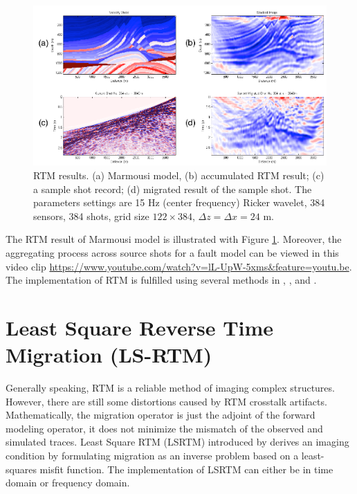 \documentclass[11pt,titlepage]{article}
\theoremstyle{plain}
\theoremstyle{definition}
\theoremstyle{remark}
\numberwithin{equation}{section}
\begin{document}
\begin{figure}[htbp]
\centering
\includegraphics[width=1\textwidth]{Fig/MarmousiRTM.pdf}
\caption{RTM results. (a) Marmousi model, (b) accumulated RTM result; (c) a sample shot record; (d) migrated result of the sample shot. The parameters settings are 15 Hz (center frequency) Ricker wavelet, 384 sensors, 384 shots, grid size $122 \times 384$, $\Delta z = \Delta x = 24$ m.}
\label{fig:RTM}
\end{figure}

The RTM result of Marmousi model is illustrated with Figure \ref{fig:RTM}. Moreover, the aggregating process across source shots for a fault model can be viewed in this video clip
\url{https://www.youtube.com/watch?v=lL-UpW-5xms&feature=youtu.be}. The implementation of RTM is fulfilled using several methods in , , and .



\section{Least Square Reverse Time Migration (LS-RTM)}
Generally speaking, RTM is a reliable method of imaging complex structures. However, there are still some distortions caused by RTM crosstalk artifacts. Mathematically, the migration operator is just the adjoint of the forward modeling operator, it does not minimize the mismatch of the observed and simulated traces. Least Square RTM (LSRTM) introduced by \cite{Nemeth:1999aa} derives an imaging condition by formulating migration as an inverse problem based on a least-squares misfit function. The implementation of LSRTM can either be in time domain or frequency domain.
\end{document}
